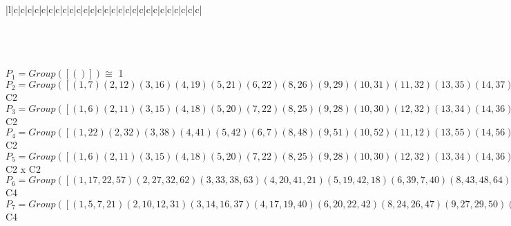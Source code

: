 \documentclass[varwidth=\maxdimen,border=10]{standalone}
\begin{document}
\begin{tabular}
\begin{array}{|l|c|c|c|c|c|c|c|c|c|c|c|c|c|c|c|c|c|c|c|c|c|c|c|c|c|c|c|}
\end{array}\)\\
\ \\
\ \\
$P_{1} = Group( [ () ] )\cong$ 1\ \\
$P_{2} = Group( [ ( 1, 7)( 2,12)( 3,16)( 4,19)( 5,21)( 6,22)( 8,26)( 9,29)(10,31)(11,32)(13,35)(14,37)(15,38)(17,40)(18,41)(20,42)(23,45)(24,47)(25,48)(27,50)(28,51)(30,52)(33,54)(34,55)(36,56)(39,57)(43,59)(44,60)(46,61)(49,62)(53,63)(58,64) ] )\cong$ C2\ \\
$P_{3} = Group( [ ( 1, 6)( 2,11)( 3,15)( 4,18)( 5,20)( 7,22)( 8,25)( 9,28)(10,30)(12,32)(13,34)(14,36)(16,38)(17,39)(19,41)(21,42)(23,44)(24,46)(26,48)(27,49)(29,51)(31,52)(33,53)(35,55)(37,56)(40,57)(43,58)(45,60)(47,61)(50,62)(54,63)(59,64) ] )\cong$ C2\ \\
$P_{4} = Group( [ ( 1,22)( 2,32)( 3,38)( 4,41)( 5,42)( 6, 7)( 8,48)( 9,51)(10,52)(11,12)(13,55)(14,56)(15,16)(17,57)(18,19)(20,21)(23,60)(24,61)(25,26)(27,62)(28,29)(30,31)(33,63)(34,35)(36,37)(39,40)(43,64)(44,45)(46,47)(49,50)(53,54)(58,59) ] )\cong$ C2\ \\
$P_{5} = Group( [ ( 1, 6)( 2,11)( 3,15)( 4,18)( 5,20)( 7,22)( 8,25)( 9,28)(10,30)(12,32)(13,34)(14,36)(16,38)(17,39)(19,41)(21,42)(23,44)(24,46)(26,48)(27,49)(29,51)(31,52)(33,53)(35,55)(37,56)(40,57)(43,58)(45,60)(47,61)(50,62)(54,63)(59,64), ( 1, 7)( 2,12)( 3,16)( 4,19)( 5,21)( 6,22)( 8,26)( 9,29)(10,31)(11,32)(13,35)(14,37)(15,38)(17,40)(18,41)(20,42)(23,45)(24,47)(25,48)(27,50)(28,51)(30,52)(33,54)(34,55)(36,56)(39,57)(43,59)(44,60)(46,61)(49,62)(53,63)(58,64) ] )\cong$ C2 x C2\ \\
$P_{6} = Group( [ ( 1,17,22,57)( 2,27,32,62)( 3,33,38,63)( 4,20,41,21)( 5,19,42,18)( 6,39, 7,40)( 8,43,48,64)( 9,30,51,31)(10,29,52,28)(11,49,12,50)(13,36,55,37)(14,35,56,34)(15,53,16,54)(23,46,60,47)(24,45,61,44)(25,58,26,59), ( 1,22)( 2,32)( 3,38)( 4,41)( 5,42)( 6, 7)( 8,48)( 9,51)(10,52)(11,12)(13,55)(14,56)(15,16)(17,57)(18,19)(20,21)(23,60)(24,61)(25,26)(27,62)(28,29)(30,31)(33,63)(34,35)(36,37)(39,40)(43,64)(44,45)(46,47)(49,50)(53,54)(58,59) ] )\cong$ C4\ \\
$P_{7} = Group( [ ( 1, 5, 7,21)( 2,10,12,31)( 3,14,16,37)( 4,17,19,40)( 6,20,22,42)( 8,24,26,47)( 9,27,29,50)(11,30,32,52)(13,33,35,54)(15,36,38,56)(18,39,41,57)(23,43,45,59)(25,46,48,61)(28,49,51,62)(34,53,55,63)(44,58,60,64), ( 1, 7)( 2,12)( 3,16)( 4,19)( 5,21)( 6,22)( 8,26)( 9,29)(10,31)(11,32)(13,35)(14,37)(15,38)(17,40)(18,41)(20,42)(23,45)(24,47)(25,48)(27,50)(28,51)(30,52)(33,54)(34,55)(36,56)(39,57)(43,59)(44,60)(46,61)(49,62)(53,63)(58,64) ] )\cong$ C4\ \\

\end{tabular}
\end{document}
